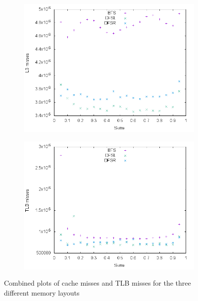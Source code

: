 \documentclass{article}
\begin{document}
\begin{figure}[H]
\begin{subfigure}[b]{0.49\textwidth}
	\end{subfigure}
	\begin{subfigure}[b]{0.49\textwidth}
		\includegraphics[width=\textwidth]{figures/combined_L3}	
	\end{subfigure}
	\begin{subfigure}[b]{0.49\textwidth}
		\includegraphics[width=\textwidth]{figures/combined_TLB}	
	\end{subfigure}
	\caption{Combined plots of cache misses and TLB misses for the three different memory layouts}
	\label{fig:combined_misses}
\end{figure}
\end{document}
